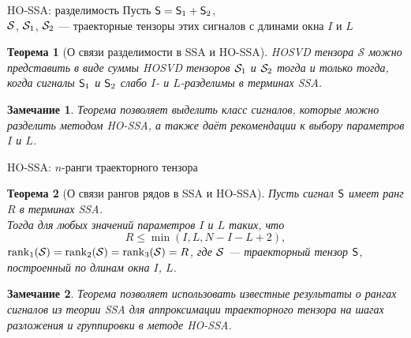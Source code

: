 \documentclass[pdf, unicode, 9pt, notheorems, handout]{beamer}
\newtheorem{theorem}{Теорема}
\newtheorem{remark}{Замечание}
\begin{document}
    \begin{frame}{HO-SSA: разделимость}
        Пусть $\mathsf{S} = \mathsf{S}_1 + \mathsf{S}_2$,\\ 
        $\mathcal{S}$, $\mathcal{S}_1$, $\mathcal{S}_2$ --- траекторные тензоры этих сигналов с длинами окна $I$ и $L$
        \begin{theorem}[О связи разделимости в SSA и HO-SSA]
            \textup{HOSVD} тензора $\mathcal{S}$ можно представить в виде суммы \textup{HOSVD}
            тензоров $\mathcal{S}_1$ и $\mathcal{S}_2$ тогда и только тогда, когда сигналы 
            $\mathsf{S}_1$ и $\mathsf{S}_2$ слабо $I$- и $L$-разделимы в терминах \textup{SSA}.
        \end{theorem}
        \vspace{0.4cm}
        \begin{remark}
            Теорема позволяет выделить класс сигналов, которые можно разделить методом \textup{HO-SSA},
            а также даёт рекомендации к выбору параметров $I$ и $L$.
        \end{remark}
    \end{frame}
    
    \begin{frame}{HO-SSA: $n$-ранги траекторного тензора}
        \begin{theorem}[О связи рангов рядов в SSA и HO-SSA]
            Пусть сигнал $\mathsf{S}$ имеет ранг $R$ в терминах \textup{SSA}.\\
            Тогда для любых значений параметров $I$ и $L$ таких, что
            \[
            R \leqslant \min(I, L, N-I-L+2),
            \] 
            $\operatorname{rank}_1(\mathcal{S})=\operatorname{rank}_2(\mathcal{S})=\operatorname{rank}_3(\mathcal{S})=R$,
            где $\mathcal{S}$ --- траекторный тензор $\mathsf{S}$, построенный по длинам окна $I$, $L$.
        \end{theorem}
        \vspace{0.4cm}
        \begin{remark}
            Теорема позволяет использовать известные результаты о рангах сигналов из теории \textup{SSA} для
            аппроксимации траекторного тензора на шагах разложения и группировки в методе \textup{HO-SSA}.
        \end{remark}
    \end{frame}
    
    
\end{document}

